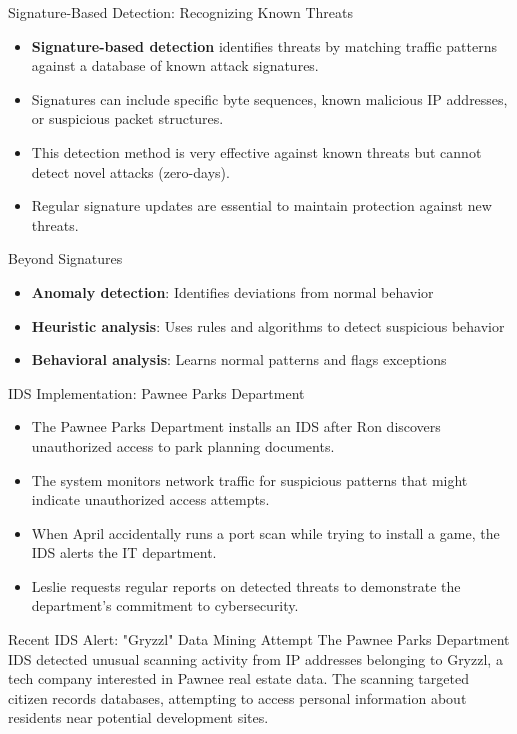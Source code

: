 \documentclass{beamer}
\begin{document}
        \begin{frame}{Signature-Based Detection: Recognizing Known Threats}
        \begin{itemize}
            \item \textbf{Signature-based detection} identifies threats by matching traffic patterns against a database of known attack signatures.
            \item Signatures can include specific byte sequences, known malicious IP addresses, or suspicious packet structures.
            \item This detection method is very effective against known threats but cannot detect novel attacks (zero-days).
            \item Regular signature updates are essential to maintain protection against new threats.
        \end{itemize}
        
        \begin{block}{Beyond Signatures}
        \begin{itemize}
            \item \textbf{Anomaly detection}: Identifies deviations from normal behavior
            \item \textbf{Heuristic analysis}: Uses rules and algorithms to detect suspicious behavior
            \item \textbf{Behavioral analysis}: Learns normal patterns and flags exceptions
        \end{itemize}
        \end{block}
        \end{frame}

        \begin{frame}{IDS Implementation: Pawnee Parks Department}
            \begin{itemize}
                \item The Pawnee Parks Department installs an IDS after Ron discovers unauthorized access to park planning documents.
                \item The system monitors network traffic for suspicious patterns that might indicate unauthorized access attempts.
                \item When April accidentally runs a port scan while trying to install a game, the IDS alerts the IT department.
                \item Leslie requests regular reports on detected threats to demonstrate the department's commitment to cybersecurity.
            \end{itemize}
            
            \begin{exampleblock}{Recent IDS Alert: "Gryzzl" Data Mining Attempt}
            The Pawnee Parks Department IDS detected unusual scanning activity from IP addresses belonging to Gryzzl, a tech company interested in Pawnee real estate data. The scanning targeted citizen records databases, attempting to access personal information about residents near potential development sites.
            \end{exampleblock}
            \end{frame}
        
\end{document}
